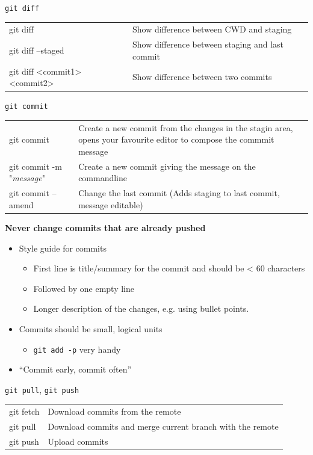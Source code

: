 \begin{frame}{\texttt{git diff}}
  \begin{tabu}{>{\ttfamily}l X[,L]}
    git diff                     & Show difference between CWD and staging\\
    git diff --staged            & Show difference between staging and last commit \\
    git diff <commit1> <commit2> & Show difference between two commits
  \end{tabu}
\end{frame}

\begin{frame}{\texttt{git commit}}
  \begin{tabu}{>{\ttfamily}l X[,L]}
    git commit                       & Create a new commit from the changes in the stagin area, opens your favourite editor to compose the commmit message \\
    git commit -m "\textit{message}" & Create a new commit giving the message on the commandline \\
    git commit --amend               & Change the last commit (Adds staging to last commit, message editable)
  \end{tabu}
  \alert{\bfseries Never change commits that are already pushed}

  \begin{itemize}
    \item Style guide for commits
      \begin{itemize}
        \item First line is title/summary for the commit and should be < 60 characters
        \item Followed by one empty line
        \item Longer description of the changes, e.g. using bullet points.
      \end{itemize}
    \item Commits should be small, logical units
      \begin{itemize}
        \item \texttt{git add -p} very handy
      \end{itemize}
    \item \enquote{Commit early, commit often}
  \end{itemize}
\end{frame}

\begin{frame}{\texttt{git pull}, \texttt{git push}}
  \begin{tabu}{>{\ttfamily}l X[,L]}
    git fetch  & Download commits from the remote \\
    git pull   & Download commits and merge current branch with the remote \\
    git push   & Upload commits
  \end{tabu}
\end{frame}

